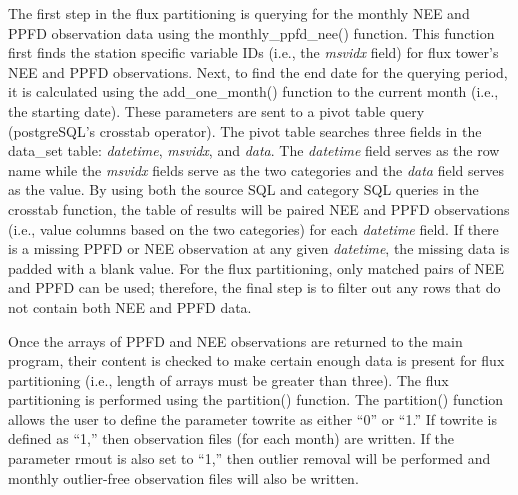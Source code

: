 The first step in the flux partitioning is querying for the monthly NEE and PPFD observation data using the monthly\_ppfd\_nee() function.  
This function first finds the station specific variable IDs (i.e., the \textit{msvidx} field) for flux tower's NEE and PPFD observations.  
Next, to find the end date for the querying period, it is calculated using the add\_one\_month() function to the current month (i.e., the starting date).  
These parameters are sent to a pivot table query (postgreSQL's crosstab\footnotemark {} operator).  
The pivot table searches three fields in the data\_set table: \textit{datetime}, \textit{msvidx}, and \textit{data}.  
The \textit{datetime} field serves as the row name while the \textit{msvidx} fields serve as the two categories and the \textit{data} field serves as the value.  
By using both the source SQL and category SQL queries in the crosstab function, the table of results will be paired NEE and PPFD observations (i.e., value columns based on the two categories) for each \textit{datetime} field.  
If there is a missing PPFD or NEE observation at any given \textit{datetime}, the missing data is padded with a blank value.  
For the flux partitioning, only matched pairs of NEE and PPFD can be used; therefore, the final step is to filter out any rows that do not contain both NEE and PPFD data.

Once the arrays of PPFD and NEE observations are returned to the main program, their content is checked to make certain enough data is present for flux partitioning (i.e., length of arrays must be greater than three).  
The flux partitioning is performed using the partition() function.  
The partition() function allows the user to define the parameter to\textunderscore write as either ``0'' or ``1.''  If to\textunderscore write is defined as ``1,'' then observation files (for each month) are written.  
If the parameter rm\textunderscore out is also set to ``1,'' then outlier removal will be performed and monthly outlier-free observation files will also be written. 

